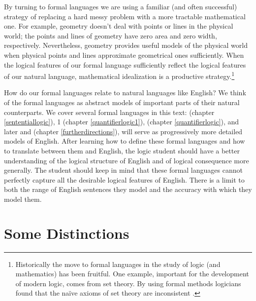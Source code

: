 By turning to formal languages we are using a familiar (and often successful) strategy of replacing a hard messy problem with a more tractable mathematical one. 
For example, geometry doesn't deal with points or lines in the physical world; the points and lines of geometry have zero area and zero width, respectively. 
Nevertheless, geometry provides useful models of the physical world when physical points and lines approximate geometrical ones sufficiently.
When the logical features of our formal language sufficiently reflect the logical features of our natural language, mathematical idealization is a productive strategy.\footnote{%
	Historically the move to formal languages in the study of logic (and mathematics) has been fruitful. 
	One example, important for the development of modern logic, comes from set theory. 
	By using formal methods logicians found that the na\"{i}ve axioms of set theory are inconsistent \citetext{see \citealp{Demopoulos2005} for a quick overview of Russell's paradox, or \citealp[ch~1]{Smullyan2010} for a more careful discussion}.
} 

How do our formal languages relate to natural languages like English?
We think of the formal languages as abstract models of important parts of their natural counterparts. 
We cover several formal languages in this text: \GSL{} (chapter \ref{sententiallogic}), \GQL{}1 (chapter \ref{quantifierlogic1}), \GQL{} (chapter \ref{quantifierlogic}), and later \MGSL{} and \GQLI{} (chapter \ref{furtherdirections}), will serve as progressively more detailed models of English. 
After learning how to define these formal languages and how to translate between them and English, the logic student should have a better understanding of the logical structure of English and of logical consequence more generally.
The student should keep in mind that these formal languages cannot perfectly capture all the desirable logical features of English. 
There is a limit to both the range of English sentences they model and the accuracy with which they model them. 

\section{Some Distinctions}\label{Some Distinctions} 
